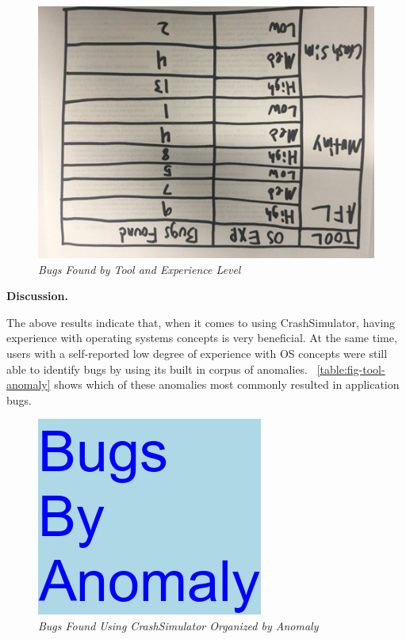 \begin{figure}[t]
  \center{}
  \includegraphics[scale=.5]{images/table1}
  \caption{\emph{Bugs Found by Tool and Experience Level}}
  \label{fig-tool-exp}
\end{figure}


{\bf Discussion. }

The above results indicate that, when it comes to using CrashSimulator,
having experience with operating systems concepts is very beneficial.  At
the same time, users with a self-reported low degree of experience with OS
concepts were still able to identify bugs by using its built in corpus of
anomalies. ~\ref{table:fig-tool-anomaly} shows which
of these anomalies most commonly
resulted in application bugs.

\begin{figure}[t]
  \center{}
  \includegraphics[scale=.5]{images/anomaly}
  \caption{\emph{Bugs Found Using CrashSimulator Organized by Anomaly}}
  \label{fig-tool-anomaly}
\end{figure}


